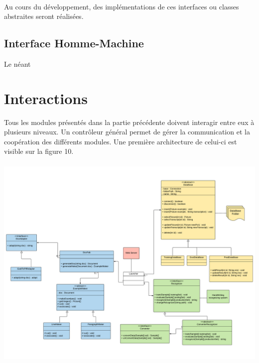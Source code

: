 \paragraph{}

Au cours du développement, des implémentations de ces interfaces ou classes abstraites seront réalisées.

\subsection{Interface Homme-Machine}

Le néant

\section{Interactions}

Tous les modules présentés dans la partie précédente doivent interagir entre eux à plusieurs niveaux. Un contrôleur général permet de gérer la communication et la coopération des différents modules. Une première architecture de celui-ci est visible sur la figure 10.

\paragraph{}

\begin{mdframed}[frametitle={Figure 10 : Diagramme de classes du contrôleur}, innerbottommargin=10]
\begin{center}
\includegraphics[scale=0.6]{Specifications.pdf}
\end{center}
\end{mdframed}

